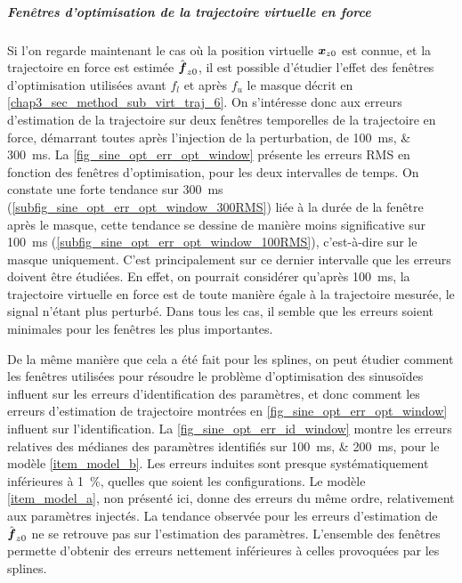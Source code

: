 \subparagraph{Fenêtres d'optimisation de la trajectoire virtuelle en force}

Si l'on regarde maintenant le cas où la position virtuelle $\vect{x}_{z0}$ est connue, et la trajectoire en force est estimée $\hat{\vect{f}}_{z0}$, il est possible d'étudier l'effet des fenêtres d'optimisation utilisées avant $f_l$ et après $f_u$ le masque décrit en \cref{chap3_sec_method_sub_virt_traj_6}. On s'intéresse donc aux erreurs d'estimation de la trajectoire sur deux fenêtres temporelles de la trajectoire en force, démarrant toutes après l'injection de la perturbation, de \SIlist{100;300}{\milli\second}. La \cref{fig_sine_opt_err_opt_window} présente les erreurs RMS en fonction des fenêtres d'optimisation, pour les deux intervalles de temps. On constate une forte tendance sur \SI{300}{\milli\second} (\cref{subfig_sine_opt_err_opt_window_300RMS}) liée à la durée de la fenêtre après le masque, cette tendance se dessine de manière moins significative sur \SI{100}{\milli\second} (\cref{subfig_sine_opt_err_opt_window_100RMS}), c'est-à-dire sur le masque uniquement. C'est principalement sur ce dernier intervalle que les erreurs doivent être étudiées. En effet, on pourrait considérer qu'après \SI{100}{\milli\second}, la trajectoire virtuelle en force est de toute manière égale à la trajectoire mesurée, le signal n'étant plus perturbé. Dans tous les cas, il semble que les erreurs soient minimales pour les fenêtres les plus importantes.



De la même manière que cela a été fait pour les splines, on peut étudier comment les fenêtres utilisées pour résoudre le problème d'optimisation des sinusoïdes influent sur les erreurs d'identification des paramètres, et donc comment les erreurs d'estimation de trajectoire montrées en \cref{fig_sine_opt_err_opt_window} influent sur l'identification. La \cref{fig_sine_opt_err_id_window} montre les erreurs relatives des médianes des paramètres identifiés sur \SIlist{100;200}{\milli\second}, pour le modèle \cref{item_model_b}. Les erreurs induites sont presque systématiquement inférieures à \SI{1}{\percent}, quelles que soient les configurations. Le modèle \cref{item_model_a}, non présenté ici, donne des erreurs du même ordre, relativement aux paramètres injectés. La tendance observée pour les erreurs d'estimation de $\hat{\vect{f}}_{z0}$ ne se retrouve pas sur l'estimation des paramètres. L'ensemble des fenêtres permette d'obtenir des erreurs nettement inférieures à celles provoquées par les splines.

